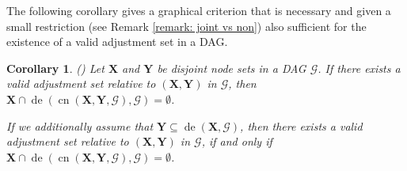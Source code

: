 \documentclass[11pt,a4paper]{article}
\newtheorem{Corollary}[Satz]{Corollary}
\theoremstyle{definition}
\theoremstyle{remark}
\DeclareMathOperator{\de}{de}
\DeclareMathOperator{\CN}{cn}
\newcommand{\g}[1][G]{\mathcal{#1}}
\newcommand{\cnb}[2][X,Y]{\CN(\mathbf{#1},#2)}
\begin{document}
The following corollary gives a graphical criterion that is necessary and given a small restriction (see Remark \ref{remark: joint vs non}) also sufficient for the existence of a valid adjustment set in a DAG. 


\begin{Corollary}(\citealp[Cf.\ Corollary 27 of][]{perkovic16})
	Let $\mathbf{X}$ and $\mathbf{Y}$ be disjoint node sets in a DAG $\g$. If there exists a valid adjustment set relative to $(\mathbf{X},\mathbf{Y})$ in $\g$, then $\mathbf{X} \cap \de(\cnb{\g},\g) = \emptyset$.  
	
	If we additionally assume that $\mathbf{Y} \subseteq \de(\mathbf{X},\g)$, then there exists a valid adjustment set relative to $(\mathbf{X},\mathbf{Y})$ in $\g$, if and only if $\mathbf{X} \cap \de(\cnb{\g},\g) = \emptyset$.
	\label{cor:noforbx}
\end{Corollary}
\end{document}

